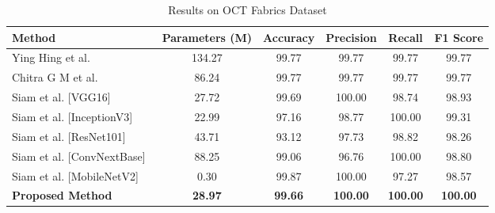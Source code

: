 \begin{table}[h]
\centering
\caption{Results on OCT Fabrics Dataset}
\label{tab:oct_results}
\begin{adjustbox}{max width=\textwidth}
\begin{tabular}{lccccc}
\toprule
\textbf{Method} & \textbf{Parameters (M)} & \textbf{Accuracy} & \textbf{Precision} & \textbf{Recall} & \textbf{F1 Score} \\
\midrule
Ying Hing et al.~\cite{hong2024research} & 134.27 & 99.77 & 99.77 & 99.77 & 99.77 \\
Chitra G M et al.~\cite{chitra2023fabric} & 86.24 & 99.77 & 99.77 & 99.77 & 99.77 \\
Siam et al. [VGG16]~\cite{siam2023textilenet} & 27.72 & 99.69 & 100.00 & 98.74 & 98.93 \\
Siam et al. [InceptionV3]~\cite{siam2023textilenet} & 22.99 & 97.16 & 98.77 & 100.00 & 99.31 \\
Siam et al. [ResNet101]~\cite{siam2023textilenet} & 43.71 & 93.12 & 97.73 & 98.82 & 98.26 \\
Siam et al. [ConvNextBase]~\cite{siam2023textilenet} & 88.25 & 99.06 & 96.76 & 100.00 & 98.80 \\
Siam et al. [MobileNetV2]~\cite{siam2023textilenet} & 0.30 & 99.87 & 100.00 & 97.27 & 98.57 \\
\textbf{Proposed Method} & \textbf{28.97} & \textbf{99.66} & \textbf{100.00} & \textbf{100.00} & \textbf{100.00} \\
\bottomrule
\end{tabular}
\end{adjustbox}
\end{table}

